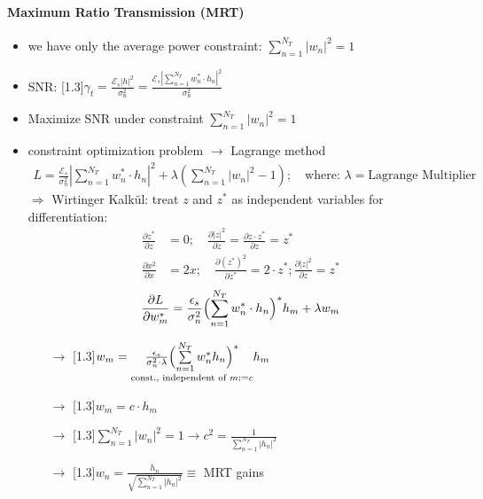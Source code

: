 \documentclass[a4paper, 10pt]{article}
\begin{document}
\paragraph{Maximum Ratio Transmission (MRT)}
\begin{itemize}
	\item we have only the average power constraint: $ \sum\limits_{n = 1}^{N_T} |w_n|^2 = 1 $
	\item SNR:  \scalebox{1.3}[1.3]{$\gamma	 _t = \frac{\mathcal{E}_s|h|^2}{\sigma _n^2} = \frac{\mathcal{E}_s\left|\sum\limits_{n = 1}^{N_T}w_n^*\cdot h_n \right|^2}{\sigma _n^2} $} 
	\item Maximize SNR under constraint $ \sum\limits _{n = 1}^{N_T}|w_n|^2 = 1 $
	\item constraint optimization problem $\rightarrow $ Lagrange method
		\begin{align*}
			L = \frac{\mathcal{E}_s}{\sigma _n^2}\left| \sum_{n = 1}^{N_T}w_n^*\cdot h_n \right |^2 + \lambda\left ( \sum_{n = 1}^{N_T}|w_n|^2 - 1\right ); \quad \text{where: } \lambda = \text{Lagrange Multiplier}
		\end{align*}
		$\Rightarrow$  Wirtinger Kalk\"ul: treat  $z$  and  $z^*$  as independent variables for differentiation:
		\begin{align*}
			\frac{\partial z^*}{\partial z} &= 0;\quad  \frac{\partial |z|^2}{\partial z} = \frac{\partial z\cdot z^*}{\partial z} = z^*\\
			\frac{\partial x^2}{\partial x} &= 2x; \quad \frac{\partial (z^*)^2}{\partial z^*} = 2\cdot z^*;  \frac{\partial |z|^2}{\partial z} = z^*
		\end{align*}
		\begin{align*}
			\frac{\partial L}{\partial w_m^*} = \frac{\epsilon _s}{\sigma _n^2}\Bigl ( \sum_{n = 1}^{N_T}w_n^*\cdot h_n\Bigr )^*h_m + \lambda w_m
		\end{align*}
		\begin{itemize}
			\item[$\rightarrow$] \scalebox{1.3}[1.3]{$   w_m =\underset{\text{const., independent of } m:=c}{\frac{\epsilon _s}{\sigma _n^2 \cdot \lambda}\Bigl ( \sum\limits_{n = 1}^{N_T}w_n^*h_n \Bigr )^*}h_m $}
			\item[$\rightarrow$] \scalebox{1.3}[1.3]{$  w_m = c\cdot h_m$}
			\item[$\rightarrow$] \scalebox{1.3}[1.3]{$ \sum\limits_{n = 1}^{N_T} |w_n|^2 = 1 \rightarrow c^2 = \frac{1}{\sum\limits_{n = 1}^{N_T}|h_n|^2}  $}
			\item[$\rightarrow$] \scalebox{1.3}[1.3]{$  w_n = \frac{h_n}{\sqrt{\sum\limits_{n = 1}^{N_T}|h_n|^2}} \equiv $} MRT gains 

\end{itemize}
\end{itemize}
\end{document}

